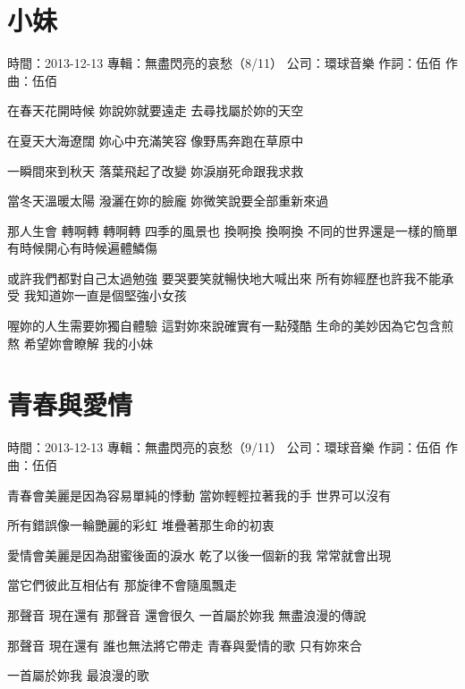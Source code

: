 \documentclass[UTF8,a4paper,oneside,twocolumn,12pt]{ctexbook}
\newcommand{\infopair}[2]{\textbullet #1：#2}
\newcommand{\zc}[1][伍佰]{\infopair{作詞}{#1}}
\newcommand{\zq}[1][伍佰]{\infopair{作曲}{#1}}
\newcommand{\zj}[1]{\infopair{專輯}{#1}}
\newcommand{\sj}[1]{\infopair{時間}{#1}}
\newcommand{\gs}[1]{\infopair{公司}{#1}}
\newenvironment{info}{\begin{flushleft}\kaishu
	}
	{\end{flushleft}\normalsize\yahei\par}
\newenvironment{lyric}{
	}
{}
\begin{document}
\section{小妹}
\begin{info}
	\sj{2013-12-13}
	\zj{無盡閃亮的哀愁（8/11）}
	\gs{環球音樂}
	\zc
	\zq
\end{info}
\begin{lyric}
	在春天花開時候
	妳說妳就要遠走
	去尋找屬於妳的天空

	在夏天大海遼闊
	妳心中充滿笑容
	像野馬奔跑在草原中

	一瞬間來到秋天
	落葉飛起了改變
	妳淚崩死命跟我求救

	當冬天溫暖太陽
	潑灑在妳的臉龐
	妳微笑說要全部重新來過

	那人生會 轉啊轉 轉啊轉
	四季的風景也 換啊換 換啊換
	不同的世界還是一樣的簡單
	有時候開心有時候遍體鱗傷

	或許我們都對自己太過勉強
	要哭要笑就暢快地大喊出來
	所有妳經歷也許我不能承受
	我知道妳一直是個堅強小女孩

	喔妳的人生需要妳獨自體驗
	這對妳來說確實有一點殘酷
	生命的美妙因為它包含煎熬
	希望妳會瞭解 我的小妹
\end{lyric}

\section{青春與愛情}
\begin{info}
	\sj{2013-12-13}
	\zj{無盡閃亮的哀愁（9/11）}
	\gs{環球音樂}
	\zc
	\zq
\end{info}
\begin{lyric}
	青春會美麗是因為容易單純的悸動
	當妳輕輕拉著我的手  世界可以沒有

	所有錯誤像一輪艷麗的彩虹
	堆疊著那生命的初衷

	愛情會美麗是因為甜蜜後面的淚水
	乾了以後一個新的我  常常就會出現

	當它們彼此互相佔有
	那旋律不會隨風飄走

	那聲音  現在還有  那聲音  還會很久
	一首屬於妳我  無盡浪漫的傳說

	那聲音  現在還有  誰也無法將它帶走
	青春與愛情的歌  只有妳來合

	一首屬於妳我  最浪漫的歌
\end{lyric}
\end{document}
